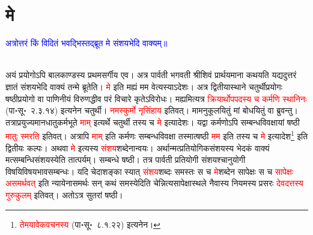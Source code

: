 \section[मे]{मे}
\centering\textcolor{blue}{अत्रोत्तरं किं विदितं भवद्भिस्तद्ब्रूत मे संशयभेदि वाक्यम्॥}\nopagebreak\\
\\
\begin{sloppypar}\justifying\noindent\hspace{10mm} अयं प्रयोगोऽपि बाल\-काण्डस्य प्रथम\-सर्गीय एव। अत्र पार्वती भगवती श्रीशिवं प्रार्थयमाना कथयति यद्यदुत्तरं ज्ञातं संशय\-भेदि वाक्यं तन्मे ब्रूतेति। \textcolor{red}{मे} इति मह्यं मम वेत्यस्याऽदेशः। अत्र द्वितीया\-स्थाने चतुर्थी\-प्रयोगः षष्ठी\-प्रयोगो वा पाणिनीयं विरुणद्धीव परं विचारे कृतेऽविरोधः। मह्यमित्यत्र \textcolor{red}{क्रियार्थोपपदस्य च कर्मणि स्थानिनः} (पा॰सू॰~२.३.१४) इत्यनेन चतुर्थी। \textcolor{red}{नमस्कुर्मो नृसिंहाय} इतिवत्। मामनुकूलयितुं मां बोधयितुं वा ब्रुवन्तु। तत्राप्रयुज्यमान\-धातु\-कर्म\-भूते \textcolor{red}{माम्‌} इत्यर्थे चतुर्थी तस्य च \textcolor{red}{मे} इत्यादेशः। यद्वा कर्मणोऽपि सम्बन्ध\-विवक्षायां षष्ठी \textcolor{red}{मातुः स्मरति} इतिवत्। अत्रापि \textcolor{red}{माम्‌} इति कर्मणः सम्बन्ध\-विवक्षा तस्मात्षष्ठी \textcolor{red}{मम} इति तस्य च \textcolor{red}{मे} इत्यादेश\footnote{\textcolor{red}{तेमयावेकवचनस्य} (पा॰सू॰~८.१.२२) इत्यनेन।} इति द्वितीयः कल्पः। अथवा \textcolor{red}{मे} इत्यस्य \textcolor{red}{संशय}\-शब्देनान्वयः। अर्थान्मत्प्रतियोगिक\-संशयस्य भेदकं वाक्यं मत्सम्बन्धि\-संशयस्येति तात्पर्यम्। सम्बन्धे षष्ठी। तत्र पार्वती प्रतियोगी संशयश्चानुयोगी विषयि\-विषय\-भाव\-सम्बन्धः। यदि चेदाशङ्का स्यात् \textcolor{red}{संशय}\-शब्दः समस्तः स च \textcolor{red}{मे}\-शब्देन सापेक्षः स च \textcolor{red}{सापेक्षः असमर्थवत्‌} इति न्यायेनासमर्थः सन् कथं समस्येदिति चेन्नित्य\-सापेक्षा\-स्थले नैवास्य नियमस्य प्रसरः \textcolor{red}{देवदत्तस्य गुरुकुलम्‌} इतिवत्। अतोऽत्र सुतरां षष्ठी।\end{sloppypar}
